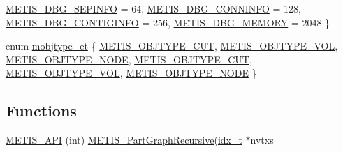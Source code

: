 \begin{DoxyCompactItemize}
\newline
\hyperlink{a00879_ac50415aa8003f9b7bf0aabb2b0d50877af722c2e095672f4e307b998fa15cb10d}{M\+E\+T\+I\+S\+\_\+\+D\+B\+G\+\_\+\+S\+E\+P\+I\+N\+FO} = 64, 
\hyperlink{a00879_ac50415aa8003f9b7bf0aabb2b0d50877a9cca1bd8cfe9cdc953d022f9bd248cc7}{M\+E\+T\+I\+S\+\_\+\+D\+B\+G\+\_\+\+C\+O\+N\+N\+I\+N\+FO} = 128, 
\hyperlink{a00879_ac50415aa8003f9b7bf0aabb2b0d50877ac0e11c887ddb971960bf285b93bb622e}{M\+E\+T\+I\+S\+\_\+\+D\+B\+G\+\_\+\+C\+O\+N\+T\+I\+G\+I\+N\+FO} = 256, 
\hyperlink{a00879_ac50415aa8003f9b7bf0aabb2b0d50877aefec4afc67dc93146c641a7ca8cc07cd}{M\+E\+T\+I\+S\+\_\+\+D\+B\+G\+\_\+\+M\+E\+M\+O\+RY} = 2048
 \}
\item 
enum \hyperlink{a00876_ad8332705ea18c63b06801b0630db9bb8}{mobjtype\+\_\+et} \{ \newline
\hyperlink{a00876_ad8332705ea18c63b06801b0630db9bb8a573335f3178103a5f6989eb71f6d6408}{M\+E\+T\+I\+S\+\_\+\+O\+B\+J\+T\+Y\+P\+E\+\_\+\+C\+UT}, 
\hyperlink{a00876_ad8332705ea18c63b06801b0630db9bb8ac3b12f1f07abe8b2e370eec53c54b99e}{M\+E\+T\+I\+S\+\_\+\+O\+B\+J\+T\+Y\+P\+E\+\_\+\+V\+OL}, 
\hyperlink{a00876_ad8332705ea18c63b06801b0630db9bb8aa12a14948e39090b8ca35989d375050f}{M\+E\+T\+I\+S\+\_\+\+O\+B\+J\+T\+Y\+P\+E\+\_\+\+N\+O\+DE}, 
\hyperlink{a00879_ad8332705ea18c63b06801b0630db9bb8a573335f3178103a5f6989eb71f6d6408}{M\+E\+T\+I\+S\+\_\+\+O\+B\+J\+T\+Y\+P\+E\+\_\+\+C\+UT}, 
\newline
\hyperlink{a00879_ad8332705ea18c63b06801b0630db9bb8ac3b12f1f07abe8b2e370eec53c54b99e}{M\+E\+T\+I\+S\+\_\+\+O\+B\+J\+T\+Y\+P\+E\+\_\+\+V\+OL}, 
\hyperlink{a00879_ad8332705ea18c63b06801b0630db9bb8aa12a14948e39090b8ca35989d375050f}{M\+E\+T\+I\+S\+\_\+\+O\+B\+J\+T\+Y\+P\+E\+\_\+\+N\+O\+DE}
 \}
\end{DoxyCompactItemize}
\subsection*{Functions}
\begin{DoxyCompactItemize}
\item 
\hyperlink{a00876_a57b80ef4a852110c44a76feb8238c2b4}{M\+E\+T\+I\+S\+\_\+\+A\+PI} (int) \hyperlink{a00260_a25fc90fd934931239b3c98ac4bdbce76}{M\+E\+T\+I\+S\+\_\+\+Part\+Graph\+Recursive}(\hyperlink{a00876_aaa5262be3e700770163401acb0150f52}{idx\+\_\+t} $\ast$nvtxs
\end{DoxyCompactItemize}

